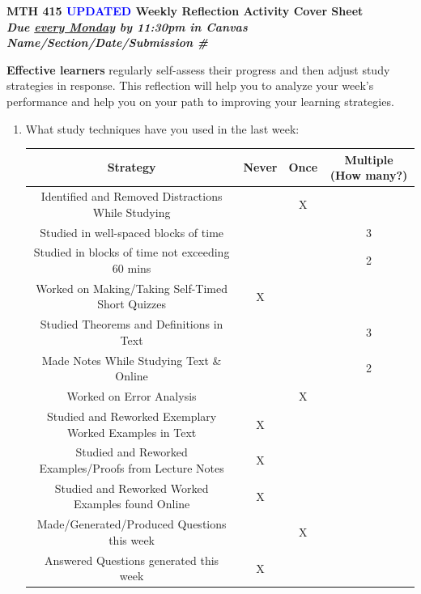 \documentclass[10pt]{article}
\begin{document}
\begin{center}
\Large \bfseries MTH 415 \textcolor{blue}{UPDATED} Weekly Reflection Activity Cover Sheet\\ 
{\it Due \underline{every Monday} by 11:30pm in Canvas}\\ 
\smallskip
\it Name/Section/Date/Submission \# 
\end{center}

{\bf Effective learners} regularly self-assess their progress and then adjust study strategies in response. This reflection will help you to analyze your week's performance and help you on your path to improving your learning strategies.

\begin{enumerate}

\item What study techniques have you used in the last week:\\
	
	\begin{tabular}{|c|c|c|c|}
		\hline
		 {\bf Strategy} & {\bf Never} & {\bf Once} & {\bf Multiple (How many?)}\\
		\hline
		Identified and Removed Distractions While Studying &&X&\\
		\hline
		Studied in well-spaced blocks of time &&&3\\
		\hline
		Studied in blocks of time not exceeding 60 mins &&&2\\
		\hline
		Worked on Making/Taking Self-Timed Short Quizzes &X&&\\
		\hline
		\hline


		Studied Theorems and Definitions in Text&&&3\\
		\hline 
		Made Notes While Studying Text \& Online&&&2\\
		\hline 
		Worked on Error Analysis&&X&\\
		\hline 
		\hline
		 
		Studied and Reworked Exemplary Worked Examples in Text &X&&\\
		\hline 
		Studied and Reworked Examples/Proofs from Lecture Notes &X&&\\
		\hline 
		Studied and Reworked Worked Examples found Online &X&&\\
		\hline 
		\hline


		Made/Generated/Produced Questions this week &&X&\\
		\hline
		Answered Questions generated this week &X&&\\
		\hline
		\hline
		

\end{tabular}
\end{enumerate}
\end{document}
